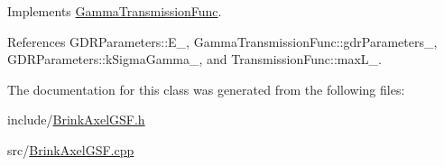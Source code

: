 Implements \hyperlink{classGammaTransmissionFunc_a68156d72ed9620f66f96dc37bbf781aa}{Gamma\-Transmission\-Func}.



References G\-D\-R\-Parameters\-::\-E\-\_\-, Gamma\-Transmission\-Func\-::gdr\-Parameters\-\_\-, G\-D\-R\-Parameters\-::k\-Sigma\-Gamma\-\_\-, and Transmission\-Func\-::max\-L\-\_\-.



The documentation for this class was generated from the following files\-:\begin{DoxyCompactItemize}
\item 
include/\hyperlink{BrinkAxelGSF_8h}{Brink\-Axel\-G\-S\-F.\-h}\item 
src/\hyperlink{BrinkAxelGSF_8cpp}{Brink\-Axel\-G\-S\-F.\-cpp}\end{DoxyCompactItemize}

